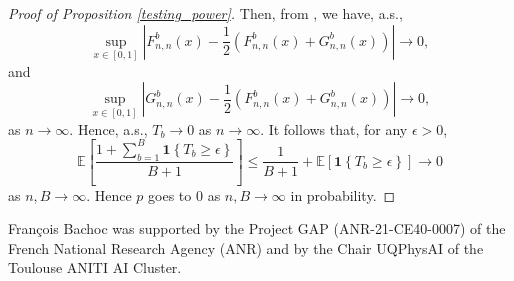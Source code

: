 \documentclass{imsart}
\numberwithin{equation}{section}
\begin{document}
\begin{proof}[Proof of Proposition \ref{testing_power}]
	Then, from \cite[Thm 3.7.2]{vanderVaart1996}, we have, a.s.,
	\[
	\sup_{x \in [0,1]}
	\left| 
	F^b_{n,n}(x)
	-
	\frac{1}{2}
	(F^b_{n,n}(x)
	+
	G^b_{n,n}(x))
	\right| 
	\to 0,
	\]
	and 
	\[
	\sup_{x \in [0,1]}
	\left| 
	G^b_{n,n}(x)
	-
	\frac{1}{2}
	(F^b_{n,n}(x)
	+
	G^b_{n,n}(x))
	\right| 
	\to 0,
	\]
	as $n \to \infty$.
	Hence, 
	a.s., $T_b \to 0$ as $n \to \infty$. It follows that, for any $\epsilon >0$,
	\[
	\mathbb{E}
	\left[ 
	\frac{1+\sum_{b=1}^{B}
		\mathbf{1} \left\{ 
		T_b \ge \epsilon
		\right\}
	}{B+1}
	\right]
	\le 
	\frac{1}{B+1}
	+
	\mathbb{E}
	\left[ 
	\mathbf{1} \left\{ 
	T_b \ge \epsilon \right\}
	\right]
	\to 0
	\]
	as $n,B \to \infty$. Hence $ p$ goes to $0$ as $n,B \to \infty$ in probability.
	
\end{proof}


\begin{funding}
Fran\c{c}ois Bachoc was supported by the Project GAP (ANR-21-CE40-0007)
of the French National Research Agency (ANR)
and by the Chair UQPhysAI of the Toulouse ANITI AI Cluster. 
\end{funding}
\end{document}
